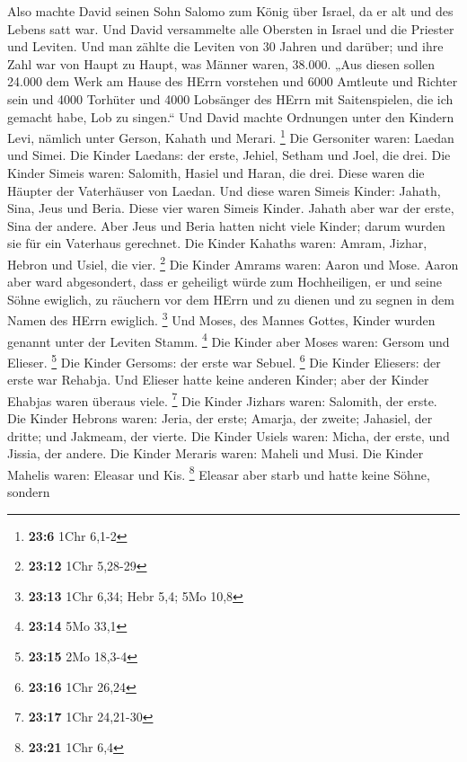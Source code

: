  Also machte David seinen Sohn Salomo zum König über
Israel, da er alt und des Lebens satt war.  Und David
versammelte alle Obersten in Israel und die Priester und Leviten.
 Und man zählte die Leviten von 30 Jahren und darüber; und
ihre Zahl war von Haupt zu Haupt, was Männer waren, 38.000.
 „Aus diesen sollen 24.000 dem Werk am Hause des HErrn
vorstehen und 6000 Amtleute und Richter sein  und 4000
Torhüter und 4000 Lobsänger des HErrn mit Saitenspielen, die ich gemacht
habe, Lob zu singen.``  Und David machte Ordnungen unter
den Kindern Levi, nämlich unter Gerson, Kahath und Merari. \footnote{\textbf{23:6}
  1Chr 6,1-2}  Die Gersoniter waren: Laedan und Simei.
 Die Kinder Laedans: der erste, Jehiel, Setham und Joel,
die drei.  Die Kinder Simeis waren: Salomith, Hasiel und
Haran, die drei. Diese waren die Häupter der Vaterhäuser von Laedan.
 Und diese waren Simeis Kinder: Jahath, Sina, Jeus und
Beria. Diese vier waren Simeis Kinder.  Jahath aber war
der erste, Sina der andere. Aber Jeus und Beria hatten nicht viele
Kinder; darum wurden sie für ein Vaterhaus gerechnet. 
Die Kinder Kahaths waren: Amram, Jizhar, Hebron und Usiel, die vier.
\footnote{\textbf{23:12} 1Chr 5,28-29}  Die Kinder Amrams
waren: Aaron und Mose. Aaron aber ward abgesondert, dass er geheiligt
würde zum Hochheiligen, er und seine Söhne ewiglich, zu räuchern vor dem
HErrn und zu dienen und zu segnen in dem Namen des HErrn ewiglich.
\footnote{\textbf{23:13} 1Chr 6,34; Hebr 5,4; 5Mo 10,8} 
Und Moses, des Mannes Gottes, Kinder wurden genannt unter der Leviten
Stamm. \footnote{\textbf{23:14} 5Mo 33,1}  Die Kinder
aber Moses waren: Gersom und Elieser. \footnote{\textbf{23:15} 2Mo
  18,3-4}  Die Kinder Gersoms: der erste war Sebuel.
\footnote{\textbf{23:16} 1Chr 26,24}  Die Kinder
Eliesers: der erste war Rehabja. Und Elieser hatte keine anderen Kinder;
aber der Kinder Ehabjas waren überaus viele. \footnote{\textbf{23:17}
  1Chr 24,21-30}  Die Kinder Jizhars waren: Salomith, der
erste.  Die Kinder Hebrons waren: Jeria, der erste;
Amarja, der zweite; Jahasiel, der dritte; und Jakmeam, der vierte.
 Die Kinder Usiels waren: Micha, der erste, und Jissia,
der andere.  Die Kinder Meraris waren: Maheli und Musi.
Die Kinder Mahelis waren: Eleasar und Kis. \footnote{\textbf{23:21} 1Chr
  6,4}  Eleasar aber starb und hatte keine Söhne, sondern
